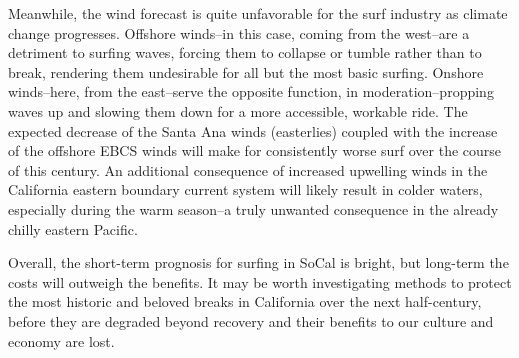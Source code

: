 \documentclass[12pt, letterpaper]{article}
\begin{document}
	Meanwhile, the wind forecast is quite unfavorable for the surf industry as climate change progresses. Offshore winds--in this case, coming from the west--are a detriment to surfing waves, forcing them to collapse or tumble rather than to break, rendering them undesirable for all but the most basic surfing. Onshore winds--here, from the east--serve the opposite function, in moderation--propping waves up and slowing them down for a more accessible, workable ride. \citep{surfing-science} The expected decrease of the Santa Ana winds (easterlies) coupled with the increase of the offshore EBCS winds will make for consistently worse surf over the course of this century. An additional consequence of increased upwelling winds in the California eastern boundary current system will likely result in colder waters, especially during the warm season\citep{winds-coastal}--a truly unwanted consequence in the already chilly eastern Pacific.

	Overall, the short-term prognosis for surfing in SoCal is bright, but long-term the costs will outweigh the benefits. It may be worth investigating methods to protect the most historic and beloved breaks in California over the next half-century, before they are degraded beyond recovery and their benefits to our culture and economy are lost.

	\pagebreak
	
	
\end{document}
